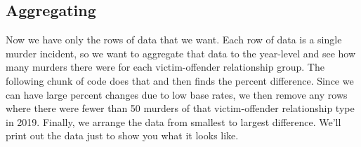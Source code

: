 \documentclass[
  a4paper,
]{krantz}
\begin{document}
\hypertarget{aggregating}{%
\subsection{Aggregating}\label{aggregating}}

Now we have only the rows of data that we want. Each row of
data is a single murder incident, so we want to aggregate
that data to the year-level and see how many murders there
were for each victim-offender relationship group. The
following chunk of code does that and then finds the percent
difference. Since we can have large percent changes due to
low base rates, we then remove any rows where there were
fewer than 50 murders of that victim-offender relationship
type in 2019. Finally, we arrange the data from smallest to
largest difference. We'll print out the data just to show
you what it looks like.
\end{document}
